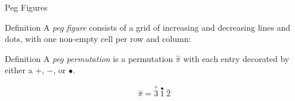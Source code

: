 \documentclass[xcolor=table,dvipsnames]{beamer}
\begin{document}
  \begin{frame}{Peg Figures} \pause
    \begin{block}{Definition}
      A \emph{peg figure} consists of a grid of increasing and decreasing lines
      and dots, with one non-empty cell per row and column:
    \end{block} 

    \begin{center}
    \end{center}
    
    \vspace{-1pc}
    \pause

    \begin{block}{Definition}
      A \emph{peg permutation} is a permutation $\overset{\sim}{\pi}$ with each
      entry decorated by either a $+$, $-$, or $\bullet$. 
    \end{block}

    \vspace{-1pc}

    \pause

    $$ \overset{\sim}{\pi} = \overset{+}{3}\ \overset{\bullet}{1}\ \overset{-}{2} $$
  \end{frame}
\end{document}
